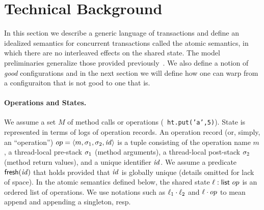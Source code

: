 \newcommand\obseq{\stackrel{\sim}{=}}
\newcommand\CS{\{c,\sigma\}}
\newcommand\CpSp{\{c',\sigma'\}}
\newcommand\numCS[1]{\{c_{#1},\sigma_{#1}\}}

\newcommand\tstep[3]{#1 \lightning (#2,#3)}
\newcommand\stept{\lightning\!\lightning}
\renewcommand\step[3]{#1 \stept (#2,#3)}

\newcommand\BigStep{\Downarrow}

\newcommand\myT{T}
\newcommand\fork[1]{\texttt{fork }#1}
\newcommand\local[1]{\texttt{local }#1}
\newcommand\txnstep[1]{\;\underrightharpdown{\;#1\;}\;}
\newcommand\txnstept[1]{\underrightharpdown{\;#1\;}}

\section{Technical Background}

In this section we describe a generic language of transactions and
define an idealized semantics for concurrent transactions called the
atomic semantics, in which there are no interleaved effects on the
shared state. 
%
The model preliminaries generalize those provided previously~\cite{PMPY}.
%
We also define a notion of \emph{good} configurations
and in the next section we will define how one can warp from a 
configuraiton that is not good to one that is.

\paragraph{Operations and States.}
We assume a set $M$ of method calls or operations (\eg\
  \texttt{ht.put('a',5)}).
%
State is represented in terms of
logs of operation records. An operation record (or, simply, an ``operation'')
$
    op = \langle m, \sigma_1, \sigma_2, \mathit{id} \rangle
$
is a tuple consisting of the operation name $m$, 
a thread-local pre-stack $\sigma_1$ (method arguments),
a thread-local post-stack $\sigma_2$ (method return values),
and a unique identifier $\mathit{id}$.
%
We assume a predicate $\textsf{fresh}(\mathit{id})$ that holds provided that $\mathit{id}$
is globally unique (details omitted for lack of space).
%
In the atomic semantics defined below, the shared state $\ell :
\textsf{list } op$ is an ordered list of operations.
%
We use notations such as $\ell_1\cdot\ell_2$ and $\ell\cdot op$ to
mean append and appending a singleton, resp.

